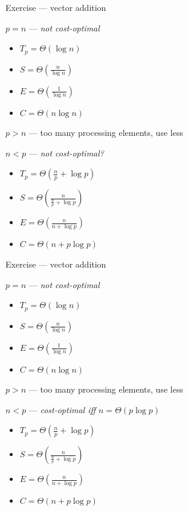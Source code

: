 \documentclass[10pt, t]{beamer}
\begin{document}
  \begin{frame}{Exercise --- vector addition}
    \addtocounter{framenumber}{-1}
    $p=n$ --- \emph{not cost-optimal}
    \begin{itemize}
      \item $T_p=\Theta(\log n)$
      \item $S=\Theta(\frac{n}{\log n})$
      \item $E=\Theta(\frac{1}{\log n})$
      \item $C=\Theta(n\log n)$
    \end{itemize}

    $p>n$ --- too many processing elements, use less

    $n<p$ --- \emph{not cost-optimal?}
    \begin{itemize}
      \item $T_p=\Theta(\frac{n}{p}+\log p)$
      \item $S=\Theta(\frac{n}{\frac{n}{p}+\log p})$
      \item $E=\Theta(\frac{n}{n+\log p})$
      \item $C=\Theta(n+p\log p)$
    \end{itemize}
  \end{frame}

  \begin{frame}{Exercise --- vector addition}
    \addtocounter{framenumber}{-1}
    $p=n$ --- \emph{not cost-optimal}
    \begin{itemize}
      \item $T_p=\Theta(\log n)$
      \item $S=\Theta(\frac{n}{\log n})$
      \item $E=\Theta(\frac{1}{\log n})$
      \item $C=\Theta(n\log n)$
    \end{itemize}

    $p>n$ --- too many processing elements, use less

    $n<p$ --- \emph{cost-optimal iff $n=\Theta(p\log p)$}
    \begin{itemize}
      \item $T_p=\Theta(\frac{n}{p}+\log p)$
      \item $S=\Theta(\frac{n}{\frac{n}{p}+\log p})$
      \item $E=\Theta(\frac{n}{n+\log p})$
      \item $C=\Theta(n+p\log p)$
    \end{itemize}
  \end{frame}
\end{document}
